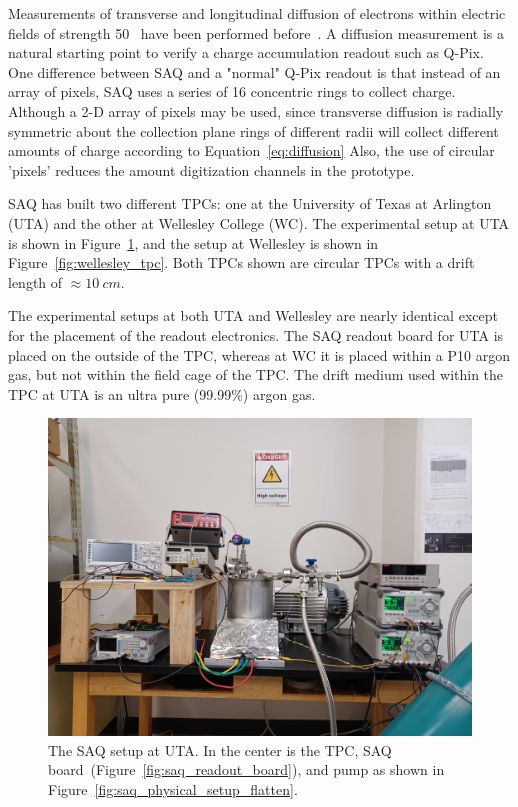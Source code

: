 Measurements of transverse and longitudinal diffusion of electrons within electric fields of strength 50~\unit{} have been performed before~\citep{lar_diffusion_measurement_LI2016160}.
A diffusion measurement is a natural starting point to verify a charge accumulation readout such as Q-Pix.
One difference between SAQ and a "normal" Q-Pix readout is that instead of an array of pixels, SAQ uses a series of 16 concentric rings to collect charge.
Although a 2-D array of pixels may be used, since transverse diffusion is radially symmetric about the collection plane rings of different radii will collect different amounts of charge according to Equation~\ref{eq:diffusion}
Also, the use of circular 'pixels' reduces the amount digitization channels in the prototype.

SAQ has built two different TPCs: one at the University of Texas at Arlington (UTA) and the other at Wellesley College (WC).
The experimental setup at UTA is shown in Figure~\ref{fig:saq_setup_flatten}, and the setup at Wellesley is shown in Figure~\ref{fig:wellesley_tpc}.
Both TPCs shown are circular TPCs with a drift length of $\approx 10~\unit{cm}$.

The experimental setups at both UTA and Wellesley are nearly identical except for the placement of the readout electronics.
The SAQ readout board for UTA is placed on the outside of the TPC, whereas at WC it is placed within a P10 argon gas, but not within the field cage of the TPC.
The drift medium used within the TPC at UTA is an ultra pure (99.99\%) argon gas.

\begin{figure}[]
\centering
\includegraphics[width=\textwidth]{images/SAQ_physical_setup.jpg}
\caption{The SAQ setup at UTA.
In the center is the TPC, SAQ board~(Figure~\ref{fig:saq_readout_board}), and pump as shown in Figure~\ref{fig:saq_physical_setup_flatten}.
}
\label{fig:saq_setup_flatten}
\end{figure}

